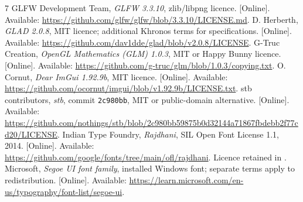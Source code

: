 \documentclass[10pt,a4paper,twocolumn]{article}
\newcommand{\code}[1]{\texttt{#1}}
\begin{document}
\balance
\begin{thebibliography}{7}
\small
\setlength{\itemsep}{2pt plus 1pt minus 1pt}
GLFW Development Team, \textit{GLFW 3.3.10}, zlib/libpng licence. [Online]. Available: \url{https://github.com/glfw/glfw/blob/3.3.10/LICENSE.md}.
D. Herberth, \textit{GLAD 2.0.8}, MIT licence; additional Khronos terms for specifications. [Online]. Available: \url{https://github.com/dav1dde/glad/blob/v2.0.8/LICENSE}.
G-Truc Creation, \textit{OpenGL Mathematics (GLM) 1.0.3}, MIT or Happy Bunny licence. [Online]. Available: \url{https://github.com/g-truc/glm/blob/1.0.3/copying.txt}.
O. Cornut, \textit{Dear ImGui 1.92.9b}, MIT licence. [Online]. Available: \url{https://github.com/ocornut/imgui/blob/v1.92.9b/LICENSE.txt}.
stb contributors, \textit{stb}, commit \code{2c980bb}, MIT or public-domain alternative. [Online]. Available: \url{https://github.com/nothings/stb/blob/2c980bb59875b0d32144a71867fbdebb2f77cd20/LICENSE}.
Indian Type Foundry, \textit{Rajdhani}, SIL Open Font License 1.1, 2014. [Online]. Available: \url{https://github.com/google/fonts/tree/main/ofl/rajdhani}. Licence retained in .
Microsoft, \textit{Segoe UI font family}, installed Windows font; separate terms apply to redistribution. [Online]. Available: \url{https://learn.microsoft.com/en-us/typography/font-list/segoe-ui}.
\end{thebibliography}
\end{document}
